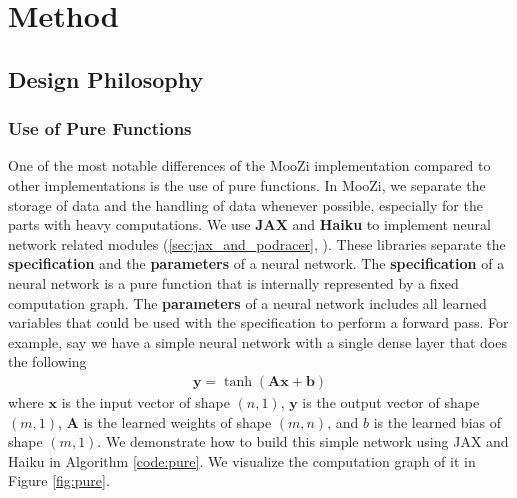 \chapter{Method} \label{sec:method}
\section{Design Philosophy}

\subsection{Use of Pure Functions}
One of the most notable differences of the MooZi implementation compared to other implementations is the use of pure functions.
In MooZi, we separate the storage of data and the handling of data whenever possible, especially for the parts with heavy computations.
We use \textbf{JAX} and \textbf{Haiku} to implement neural network related modules (\ref{sec:jax_and_podracer}, \cite{HaikuSonnetJAX_Hennigan.Cai.ea_2020,JAXComposableTransformations_JamesBradbury.RoyFrostig.ea_2018}).
These libraries separate the \textbf{specification} and the \textbf{parameters} of a neural network.
The \textbf{specification} of a neural network is a pure function that is internally represented by a fixed computation graph.
The \textbf{parameters} of a neural network includes all learned variables that could be used with the specification to perform a forward pass.
For example, say we have a simple neural network with a single dense layer that does the following
\begin{align*}
    \mathbf{y} = \operatorname{tanh}\left( \mathbf{A}\mathbf{x} + \mathbf{b} \right)
\end{align*}
where $\mathbf{x}$ is the input vector of shape $(n, 1)$, $\mathbf{y}$ is the output vector of shape $(m, 1)$, $\mathbf{A}$ is the learned weights of shape $(m, n)$, and $b$ is the learned bias of shape $(m, 1)$.
We demonstrate how to build this simple network using JAX and Haiku in Algorithm \ref{code:pure}.
We visualize the computation graph of it in Figure \ref{fig:pure}.
